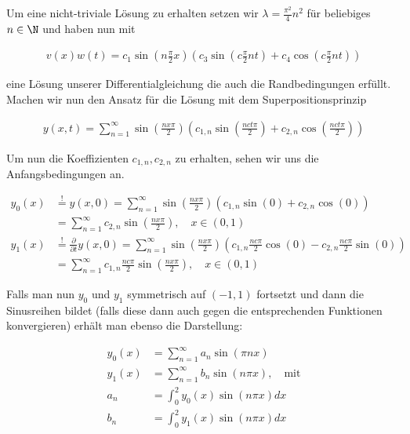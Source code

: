 \begin{solution}
Um eine nicht-triviale Lösung zu erhalten setzen wir $\lambda = \frac{\pi^2}{4}n^2$ für beliebiges $n \in \N$ und haben nun mit

\begin{align*}
  v(x)w(t)
  =
  c_1\sin\left(n\frac{\pi}{2} x\right)
  \left(c_3 \sin\left(c\frac{\pi}{2}nt\right) +
  c_4 \cos\left(c\frac{\pi}{2}nt\right)\right)
\end{align*}

eine Lösung unserer Differentialgleichung die auch die Randbedingungen erfüllt.
Machen wir nun den Ansatz für die Lösung mit dem Superpositionsprinzip

\begin{align*}
  y(x,t)
  =
  \sum_{n=1}^{\infty} \sin\left(\frac{nx\pi}{2}\right)
  \left(c_{1,n}\sin\left(\frac{nct\pi}{2}\right)+c_{2,n}\cos\left(\frac{nct\pi}{2}\right)\right)
\end{align*}

Um nun die Koeffizienten $c_{1,n},c_{2,n}$ zu erhalten, sehen wir uns die
Anfangsbedingungen an.

\begin{align*}
  y_0(x)
  &\stackrel{!}{=} y(x,0) = \sum_{n=1}^{\infty} \sin\left(\frac{nx\pi}{2}\right)
  \left(c_{1,n}\sin(0)+c_{2,n}\cos(0)\right) \\
  &= \sum_{n=1}^\infty c_{2,n}\sin\left(\frac{nx\pi}{2}\right),       \quad x \in (0,1) \\
  y_1(x)
  &\stackrel{!}{=}
  \frac{\partial}{\partial t}y(x,0) = \sum_{n=1}^{\infty} \sin\left(\frac{nx\pi}{2}\right)
  \left(c_{1,n}\frac{nc\pi}{2}\cos(0)- c_{2,n}\frac{nc\pi}{2}\sin(0)\right) \\
  &= \sum_{n=1}^\infty c_{1,n}\frac{nc\pi}{2}\sin\left(\frac{nx\pi}{2}\right),  \quad x \in (0,1)
\end{align*}

Falls man nun $y_0$ und $y_1$ symmetrisch auf $(-1,1)$
fortsetzt und dann die Sinusreihen bildet (falls diese dann auch gegen die entsprechenden Funktionen
konvergieren) erhält man ebenso die Darstellung:

\begin{align*}
  y_0(x)
  &=
  \sum_{n=1}^\infty a_n \sin(\pi nx) \\
  y_1(x)
  &=
  \sum_{n=1}^\infty b_n \sin(n \pi x), \quad \text{mit} \\
  a_n
  &=
  \int_0^2 y_0(x)\sin(n\pi x) dx \\
  b_n
  &=
  \int_0^2 y_1(x)\sin(n\pi x) dx \\
\end{align*}
\end{solution}
